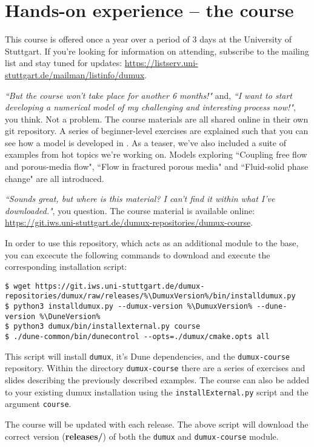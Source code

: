 \section{Hands-on \Dumux experience -- the \Dumux course}
This course is offered once a year over a period of 3 days at the University of Stuttgart.
If you're looking for information on attending, subscribe to the \Dumux mailing list
and stay tuned for updates:
\url{https://listserv.uni-stuttgart.de/mailman/listinfo/dumux}. \par
%
\textit{``But the course won't take place for another 6 months!"} and,
\textit{``I want to start developing a numerical model of my challenging and
  interesting process now!"}, you think.
Not a problem. The course materials are all shared online in their own
git repository. A series of beginner-level exercises are explained
such that you can see how a model is developed in \Dumux. As a teaser, we've
 also included a suite of examples from hot topics we're working on. Models
  exploring ``Coupling free flow and porous-media flow", ``Flow in fractured
   porous media" and ``Fluid-solid phase change" are all introduced.  \par
\textit{``Sounds great, but where is this material? I can't find it within
what I've downloaded."}, you question.
The \Dumux course material is available online:
\url{https://git.iws.uni-stuttgart.de/dumux-repositories/dumux-course}. \par
In order to use this repository, which acts as an additional module to
the \Dumux base, you can excecute the following commands to download and execute the corresponding installation script:
\begin{lstlisting}[style=Bash,escapechar=\%]
$ wget https://git.iws.uni-stuttgart.de/dumux-repositories/dumux/raw/releases/%\DumuxVersion%/bin/installdumux.py
$ python3 installdumux.py --dumux-version %\DumuxVersion% --dune-version %\DuneVersion%
$ python3 dumux/bin/installexternal.py course
$ ./dune-common/bin/dunecontrol --opts=./dumux/cmake.opts all
\end{lstlisting}
This script will install \texttt{dumux}, it's Dune dependencies, and the \texttt{dumux-course}
repository. Within the directory \texttt{dumux-course} there are a series of exercises
and slides describing the previously described examples. The course can also be added to your existing 
dumux installation using the \texttt{installExternal.py} script and the argument \texttt{course}.\par
%
The \Dumux course will be updated with each \Dumux release.
The above script will download the correct version (\textbf{releases/\DumuxVersion}) of both
the \texttt{dumux} and \texttt{dumux-course} module.
